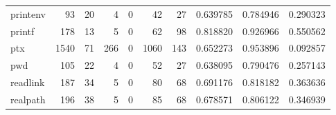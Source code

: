\begin{tabular}{lrrrrrrrrr}
printenv  &                                                 93 &                                                 20 &                                                  4 &                                                  0 &                                                 42 &                                                 27 &                                           0.639785 &                               0.784946 &                             0.290323 \\
printf    &                                                178 &                                                 13 &                                                  5 &                                                  0 &                                                 62 &                                                 98 &                                           0.818820 &                               0.926966 &                             0.550562 \\
ptx       &                                               1540 &                                                 71 &                                                266 &                                                  0 &                                               1060 &                                                143 &                                           0.652273 &                               0.953896 &                             0.092857 \\
pwd       &                                                105 &                                                 22 &                                                  4 &                                                  0 &                                                 52 &                                                 27 &                                           0.638095 &                               0.790476 &                             0.257143 \\
readlink  &                                                187 &                                                 34 &                                                  5 &                                                  0 &                                                 80 &                                                 68 &                                           0.691176 &                               0.818182 &                             0.363636 \\
realpath  &                                                196 &                                                 38 &                                                  5 &                                                  0 &                                                 85 &                                                 68 &                                           0.678571 &                               0.806122 &                             0.346939 \\

\end{tabular}
